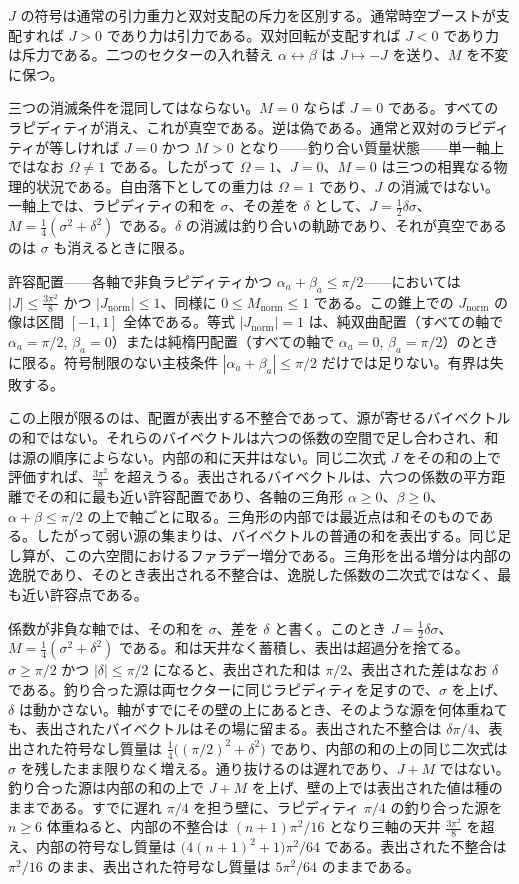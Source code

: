 \documentclass[a4paper]{article}
\newcommand{\Jnorm}{J_{\mathrm{norm}}}
\newcommand{\Mnorm}{M_{\mathrm{norm}}}
\newcommand{\Jbound}{\frac{3\pi^2}{8}}
\begin{document}
$J$ の符号は通常の引力重力と双対支配の斥力を区別する。通常時空ブーストが支配すれば $J>0$ であり力は引力である。双対回転が支配すれば $J<0$ であり力は斥力である。二つのセクターの入れ替え $\alpha\leftrightarrow\beta$ は $J\mapsto -J$ を送り、$M$ を不変に保つ。

三つの消滅条件を混同してはならない。$M=0$ ならば $J=0$ である。すべてのラピディティが消え、これが真空である。逆は偽である。通常と双対のラピディティが等しければ $J=0$ かつ $M>0$ となり——釣り合い質量状態——単一軸上ではなお $\Omega\neq 1$ である。したがって $\Omega=1$、$J=0$、$M=0$ は三つの相異なる物理的状況である。自由落下としての重力は $\Omega=1$ であり、$J$ の消滅ではない。一軸上では、ラピディティの和を $\sigma$、その差を $\delta$ として、$J=\frac12\delta\sigma$、$M=\frac14(\sigma^2+\delta^2)$ である。$\delta$ の消滅は釣り合いの軌跡であり、それが真空であるのは $\sigma$ も消えるときに限る。

許容配置——各軸で非負ラピディティかつ $\alpha_a+\beta_a\le\pi/2$——においては $|J|\le\Jbound$ かつ $|\Jnorm|\le 1$、同様に $0\le\Mnorm\le 1$ である。この錐上での $\Jnorm$ の像は区間 $[-1,1]$ 全体である。等式 $|\Jnorm|=1$ は、純双曲配置（すべての軸で $\alpha_a=\pi/2$, $\beta_a=0$）または純楕円配置（すべての軸で $\alpha_a=0$, $\beta_a=\pi/2$）のときに限る。符号制限のない主枝条件 $|\alpha_a+\beta_a|\le\pi/2$ だけでは足りない。有界は失敗する。

この上限が限るのは、配置が表出する不整合であって、源が寄せるバイベクトルの和ではない。それらのバイベクトルは六つの係数の空間で足し合わされ、和は源の順序によらない。内部の和に天井はない。同じ二次式 $J$ をその和の上で評価すれば、$\Jbound$ を超えうる。表出されるバイベクトルは、六つの係数の平方距離でその和に最も近い許容配置であり、各軸の三角形 $\alpha\ge 0$、$\beta\ge 0$、$\alpha+\beta\le\pi/2$ の上で軸ごとに取る。三角形の内部では最近点は和そのものである。したがって弱い源の集まりは、バイベクトルの普通の和を表出する。同じ足し算が、この六空間におけるファラデー増分である。三角形を出る増分は内部の逸脱であり、そのとき表出される不整合は、逸脱した係数の二次式ではなく、最も近い許容点である。

係数が非負な軸では、その和を $\sigma$、差を $\delta$ と書く。このとき $J=\tfrac12\delta\sigma$、$M=\tfrac14(\sigma^2+\delta^2)$ である。和は天井なく蓄積し、表出は超過分を捨てる。$\sigma\ge\pi/2$ かつ $|\delta|\le\pi/2$ になると、表出された和は $\pi/2$、表出された差はなお $\delta$ である。釣り合った源は両セクターに同じラピディティを足すので、$\sigma$ を上げ、$\delta$ は動かさない。軸がすでにその壁の上にあるとき、そのような源を何体重ねても、表出されたバイベクトルはその場に留まる。表出された不整合は $\delta\pi/4$、表出された符号なし質量は $\tfrac14\bigl((\pi/2)^2+\delta^2\bigr)$ であり、内部の和の上の同じ二次式は $\sigma$ を残したまま限りなく増える。通り抜けるのは遅れであり、$J+M$ ではない。釣り合った源は内部の和の上で $J+M$ を上げ、壁の上では表出された値は種のままである。すでに遅れ $\pi/4$ を担う壁に、ラピディティ $\pi/4$ の釣り合った源を $n\ge 6$ 体重ねると、内部の不整合は $(n+1)\pi^2/16$ となり三軸の天井 $\Jbound$ を超え、内部の符号なし質量は $\bigl(4(n+1)^2+1\bigr)\pi^2/64$ である。表出された不整合は $\pi^2/16$ のまま、表出された符号なし質量は $5\pi^2/64$ のままである。
\end{document}
